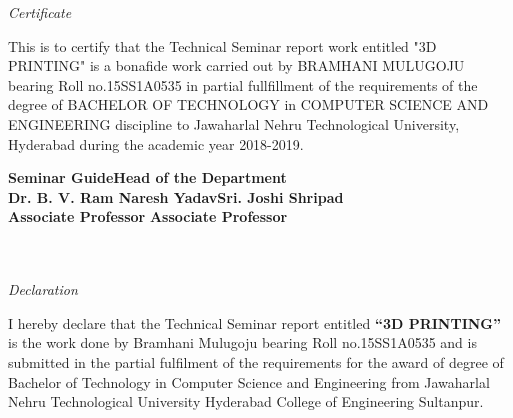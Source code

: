 \documentclass[12pt,a4paper]{report}
\begin{document}
\setcounter{page}{2}
\begin{center}
\emph{\LARGE Certificate}\\[1cm]
\end{center}

\begin{center}
\begin{minipage}{33em}
\noindent
This is to certify that the Technical Seminar report work entitled "3D PRINTING" is a bonafide work carried out by  BRAMHANI MULUGOJU bearing Roll no.15SS1A0535 in partial fullfillment of the requirements of the degree of BACHELOR OF TECHNOLOGY in COMPUTER SCIENCE AND ENGINEERING discipline to Jawaharlal Nehru Technological University, Hyderabad during the academic year 2018-2019.\\ \par 

\end{minipage}
\end{center}

\vspace{1.0in}
\noindent
\textbf{Seminar Guide}\hspace{2.1in}\textbf{Head of the Department}\\
\hspace{0.3in}\textbf{Dr. B. V. Ram Naresh Yadav}\hspace{0.9in}\textbf{Sri. Joshi Shripad}\\
\hspace{0.3in}\textbf{Associate Professor}\hspace{1.7in}	\textbf{Associate Professor}\\\\\\


\newpage %
\begin{center}
\emph{\LARGE Declaration}\\[1cm]
\end{center}
\begin{center}
\begin{minipage}{33em}
I hereby declare that the Technical Seminar report entitled \textbf{``3D PRINTING''} is the work done by Bramhani Mulugoju bearing Roll no.15SS1A0535 and is submitted in the partial fulfilment of the requirements for the award of degree of Bachelor of Technology in Computer Science and Engineering from Jawaharlal Nehru Technological University Hyderabad College of Engineering Sultanpur.
\end{minipage}
\end{center}
\end{document}

